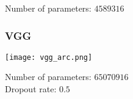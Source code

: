 \documentclass[../presentation.tex]{subfiles} %
\begin{document}
\begin{frame}







        

        Number of parameters: $4589316$
    
\end{frame}

\begin{frame}

    \frametitle{VGG}
    
    \begin{center}
        \texttt{[image: vgg\_arc.png]}
    \end{center}
    
    Number of parameters: $65070916$\\
    Dropout rate: $0.5$
\end{frame}
\end{document}
